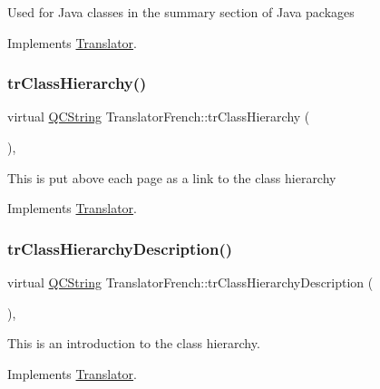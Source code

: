 Used for Java classes in the summary section of Java packages 

Implements \mbox{\hyperlink{class_translator}{Translator}}.

\mbox{\label{class_translator_french_a81218d9cf5bd9cf73a133d7003e6524e}} 
\subsubsection{\texorpdfstring{trClassHierarchy()}{trClassHierarchy()}}
{\footnotesize\ttfamily virtual \mbox{\hyperlink{class_q_c_string}{Q\+C\+String}} Translator\+French\+::tr\+Class\+Hierarchy (\begin{DoxyParamCaption}{ }\end{DoxyParamCaption})\hspace{0.3cm}{\ttfamily [inline]}, {\ttfamily [virtual]}}

This is put above each page as a link to the class hierarchy 

Implements \mbox{\hyperlink{class_translator}{Translator}}.

\mbox{\label{class_translator_french_a5ea7386af03000bb4019739d2f43d36b}} 
\subsubsection{\texorpdfstring{trClassHierarchyDescription()}{trClassHierarchyDescription()}}
{\footnotesize\ttfamily virtual \mbox{\hyperlink{class_q_c_string}{Q\+C\+String}} Translator\+French\+::tr\+Class\+Hierarchy\+Description (\begin{DoxyParamCaption}{ }\end{DoxyParamCaption})\hspace{0.3cm}{\ttfamily [inline]}, {\ttfamily [virtual]}}

This is an introduction to the class hierarchy. 

Implements \mbox{\hyperlink{class_translator}{Translator}}.

\mbox{\label{class_translator_french_adfdc5e7d298169e21a1433d0f1b8bb3c}} 
